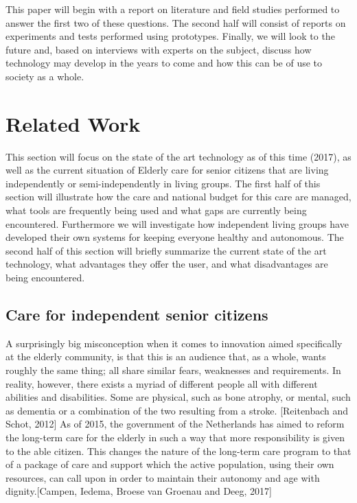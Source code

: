 \documentclass{below-ext}
\begin{document}
This paper will begin with a report on literature and field studies performed to answer the first two of these questions. The second half will consist of reports on experiments and tests performed using prototypes. Finally, we will look to the future and, based on interviews with experts on the subject, discuss how technology may develop in the years to come and how this can be of use to society as a whole.


\section{Related Work}
This section will focus on the state of the art technology as of this time (2017), as well as the current situation of Elderly care for senior citizens that are living independently or semi-independently in living groups. The first half of this section will illustrate how the care and national budget for this care are managed, what tools are frequently being used and what gaps are currently being encountered. Furthermore we will investigate how independent living groups have developed their own systems for keeping everyone healthy and autonomous. The second half of this section will briefly summarize the current state of the art technology, what advantages they offer the user, and what disadvantages are being encountered.



\subsection{Care for independent senior citizens}

A surprisingly big misconception when it comes to innovation aimed specifically at the elderly community, is that this is an audience that, as a whole, wants roughly the same thing; all share similar fears, weaknesses and requirements. In reality, however, there exists a myriad of different people all with different abilities and disabilities. Some are physical, such as bone atrophy, or mental, such as dementia or a combination of the two resulting from a stroke. [Reitenbach and Schot, 2012]  As of 2015, the government of the Netherlands has aimed to reform the long-term care for the elderly in such a way that more responsibility is given to the able citizen. This changes the nature of the long-term care program to that of a package of care and support which the active population, using their own resources, can call upon in order to maintain their autonomy and age with dignity.[Campen, Iedema, Broese van Groenau and Deeg, 2017]
\end{document}
